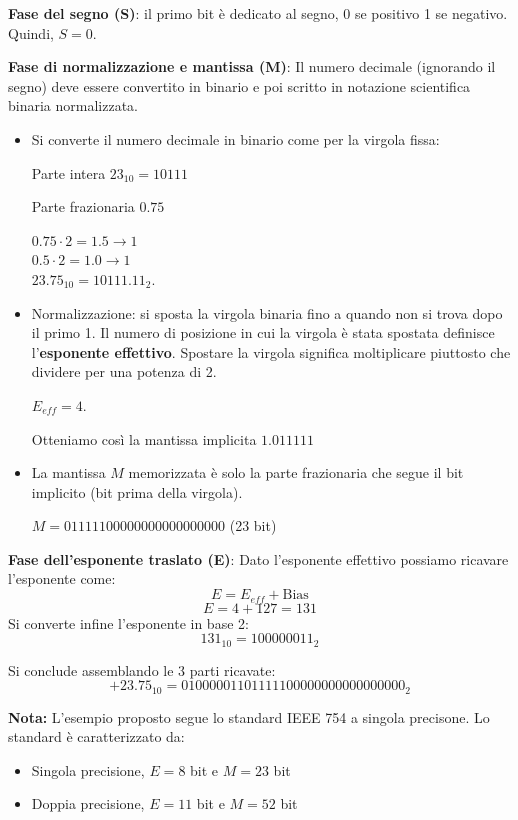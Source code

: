 \documentclass[oneside]{scrbook}
\begin{document}
\textbf{Fase del segno (S)}: il primo bit è dedicato al segno, 0 se positivo 1 se negativo. Quindi, $S = 0$.

\textbf{Fase di normalizzazione e mantissa (M)}: Il numero decimale (ignorando il segno) deve essere convertito in binario e poi scritto in notazione scientifica binaria normalizzata.
\begin{itemize}
    \item Si converte il numero decimale in binario come per la virgola fissa: 
    
    Parte intera $23_{10} = 10111$

    Parte frazionaria $0.75$
    
    $0.75 \cdot 2 = 1.5 \to 1$  \\
    $0.5 \cdot 2 = 1.0 \to 1$  \\
    
    $23.75_{10} = 10111.11_2$.
    \item Normalizzazione: si sposta la virgola binaria fino a quando non si trova dopo il primo 1. Il numero di posizione in cui la virgola è stata spostata definisce l'\textbf{esponente effettivo}. Spostare la virgola significa moltiplicare piuttosto che dividere per una potenza di 2.

    $E_{eff} = 4$.

    Otteniamo così la mantissa implicita $1.011111$
    \item La mantissa $M$ memorizzata è solo la parte frazionaria che segue il bit implicito (bit prima della virgola).

    $M = 01111100000000000000000$ (23 bit)
\end{itemize}

\textbf{Fase dell'esponente traslato (E)}: Dato l'esponente effettivo possiamo ricavare l'esponente come:
$$
    E = E_{eff} + \text{Bias}
$$
$$
    E = 4 + 127 = 131
$$
Si converte infine l'esponente in base 2:
$$
    131_{10} = 100000011_2
$$

Si conclude assemblando le 3 parti ricavate:
$$
    +23.75_{10} = 01000001101111100000000000000000_2
$$

\textbf{Nota: } L'esempio proposto segue lo standard IEEE 754 a singola precisone. Lo standard è caratterizzato da:
\begin{itemize}
    \item Singola precisione, $E = 8$ bit e $M = 23$ bit
    \item Doppia precisione, $E= 11$ bit e $M=52$ bit
\end{itemize}
\end{document}
